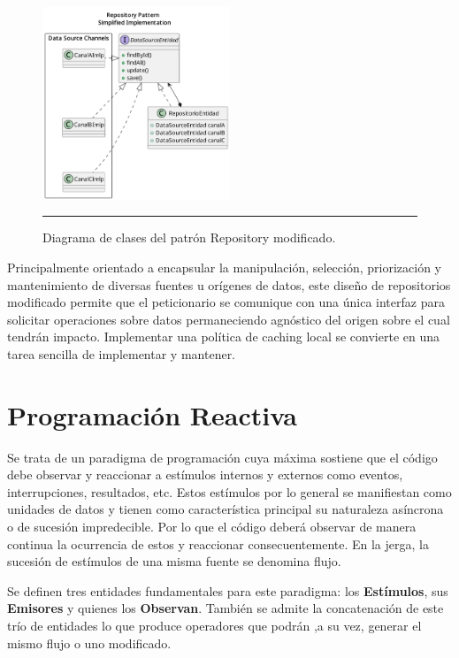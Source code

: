  \begin{figure}[htbp]
	\centering
	\includegraphics[width=0.5\textwidth]{Figures/design/CLASS_repository_reduced.png}
	\rule{35em}{1pt}
	\caption[Modified Repository Pattern Class Diagram]{Diagrama de clases del patrón Repository modificado.}
	\label{fig:uml_clases_modif_repository}
\end{figure}

Principalmente orientado a encapsular la manipulación, selección, priorización y mantenimiento de diversas fuentes u orígenes de datos, este diseño de repositorios modificado permite que el peticionario se comunique con una única interfaz para solicitar operaciones sobre datos permaneciendo agnóstico del origen  sobre el cual tendrán impacto. 
Implementar una política de caching local se convierte en una tarea sencilla de implementar y mantener.

\section{Programación Reactiva}
Se trata de un paradigma de programación cuya máxima sostiene que el código debe observar y reaccionar a estímulos internos y externos como eventos, interrupciones, resultados, etc. Estos estímulos por lo general se manifiestan como unidades de datos y tienen como característica principal su naturaleza asíncrona o de sucesión impredecible. Por lo que el código deberá observar de manera continua la ocurrencia de estos y reaccionar consecuentemente. En la jerga, la sucesión de estímulos de una misma fuente se denomina flujo.

Se definen tres entidades fundamentales para este paradigma: los \textbf{Estímulos}, sus \textbf{Emisores} y quienes los \textbf{Observan}. También se admite la concatenación de este trío de entidades lo que produce operadores que podrán ,a su vez, generar el mismo flujo o uno modificado.


